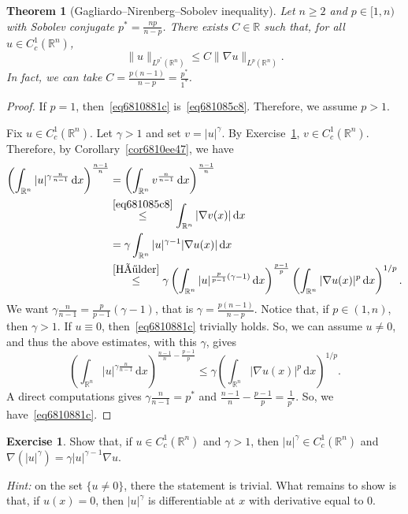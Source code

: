 \documentclass[a4paper,9pt]{amsart}
\newcommand{\R}{\mathbb{R}}	%
\newcommand{\did}{\,\mathrm{d}}	%
\newcommand{\grad}{\nabla}
\theoremstyle{plain}
\newtheorem{theorem}[proposition]{Theorem}
\theoremstyle{definition}
\newtheorem{exercise}[proposition]{Exercise}%
\theoremstyle{remark}
\begin{document}
\begin{theorem}[Gagliardo–Nirenberg–Sobolev inequality]\label{thm68108820}
	Let $n\ge2$ and $p\in[1,n)$ with Sobolev conjugate $p^* = \frac{np}{n-p}$.
	There exists $C\in\R$ such that, for all $u\in C^1_c(\R^n)$,
	\begin{equation}\label{eq6810881c}
		\|u\|_{L^{p^*}(\R^n)} \le C \|\grad u\|_{L^p(\R^n)} .
	\end{equation}
	In fact, we can take $C=\frac{p(n-1)}{n-p} = \frac{p^*}{1^*}$.
\end{theorem}
\begin{proof}
	If $p=1$, then~\eqref{eq6810881c} is~\eqref{eq681085c8}.
	Therefore, we assume $p>1$.
	
	Fix $u\in C^1_c(\R^n)$.
	Let $\gamma>1$ and set $v=|u|^\gamma$.
	By Exercise~\ref{ex68123356}, $v\in C^1_c(\R^n)$.
	Therefore, by Corollary~\ref{cor6810ee47}, we have
	\begin{align}
		\left( \int_{\R^n} |u|^{\gamma\frac{n}{n-1}} \did x \right)^{\frac{n-1}{n}}
		&= \left( \int_{\R^n} v^{\frac{n}{n-1}} \did x \right)^{\frac{n-1}{n}} \\
		&\overset{\eqref{eq681085c8}}\le \int_{\R^n} |\grad v(x)|\did x \\
		&= \gamma \int_{\R^n} |u|^{\gamma-1} |\grad u(x)|\did x \\
		&\overset{\eqref{Hölder}}\le \gamma \left( \int_{\R^n} |u|^{\frac{p}{p-1}(\gamma-1)}\did x \right)^{\frac{p-1}{p}}
			\left( \int_{\R^n} |\grad u(x)|^p \did x \right)^{1/p} .
	\end{align}
	We want $\gamma\frac{n}{n-1} = \frac{p}{p-1}(\gamma-1)$, that is $\gamma = \frac{p(n-1)}{n-p}$.
	Notice that, if $p\in(1,n)$, then $\gamma>1$.
	If $u\equiv0$, then~\eqref{eq6810881c} trivially holds.
	So, we can assume $u\neq0$, and thus the above estimates, with this $\gamma$, gives
	\begin{equation}
		\left( \int_{\R^n} |u|^{\gamma\frac{n}{n-1}} \did x \right)^{\frac{n-1}{n}-\frac{p-1}{p}} 
		\le \gamma \left( \int_{\R^n} |\grad u(x)|^p \did x \right)^{1/p} .
	\end{equation}
	A direct computations gives $\gamma\frac{n}{n-1} = p^*$ and $\frac{n-1}{n}-\frac{p-1}{p} = \frac1{p^*}$.
	So, we have~\eqref{eq6810881c}.
\end{proof}

\begin{exercise}\label{ex68123356}
	Show that, if $u\in C^1_c(\R^n)$ and $\gamma>1$, then $|u|^\gamma\in C^1_c(\R^n)$ and $\grad(|u|^\gamma) = \gamma |u|^{\gamma-1} \grad u$.
	
	{\it Hint:}
	on the set $\{u\neq 0\}$, there the statement is trivial.
	What remains to show is that, if $u(x)=0$, then $|u|^\gamma$ is differentiable at $x$ with derivative equal to $0$.
\end{exercise}
\end{document}
